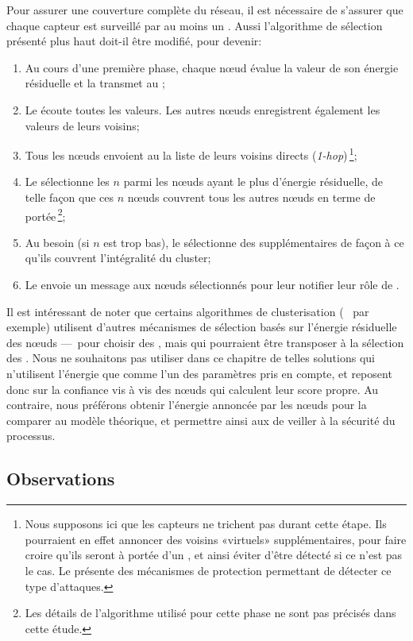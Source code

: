Pour assurer une couverture complète du réseau, il est nécessaire de s'assurer que chaque capteur est surveillé par au moins un \cn.
Aussi l'algorithme de sélection présenté plus haut doit-il être modifié, pour devenir:
\begin{enumerate}
    \item Au cours d'une première phase, chaque nœud évalue la valeur de son énergie résiduelle et la transmet au \ch;
    \item Le \ch écoute toutes les valeurs. Les autres nœuds enregistrent également les valeurs de leurs voisins;
    \item Tous les nœuds envoient au \CH la liste de leurs voisins directs (\textit{1-hop})\,\footnote{Nous supposons ici que les capteurs ne trichent pas durant cette étape. Ils pourraient en effet annoncer des voisins «virtuels» supplémentaires, pour faire croire qu'ils seront à portée d'un \cn, et ainsi éviter d'être détecté si ce n'est pas le cas. Le  présente des mécanismes de protection permettant de détecter ce type d'attaques.};
    \item Le \CH sélectionne les $n$ \cns parmi les nœuds ayant le plus d'énergie résiduelle, de telle façon que ces $n$ nœuds couvrent tous les autres nœuds en terme de portée\,\footnote{Les détails de l'algorithme utilisé pour cette phase ne sont pas précisés dans cette étude.};
    \item Au besoin (si $n$ est trop bas), le \CH sélectionne des \cns supplémentaires de façon à ce qu'ils couvrent l'intégralité du cluster;
    \item Le \CH envoie un message aux nœuds sélectionnés pour leur notifier leur rôle de \cn.
\end{enumerate}

Il est intéressant de noter que certains algorithmes de clusterisation (\heed~\cite{YF04} par exemple) utilisent d'autres mécanismes de sélection basés sur l'énergie résiduelle des nœuds ---~pour choisir des \chs, mais qui pourraient être transposer à la sélection des \cns.
Nous ne souhaitons pas utiliser dans ce chapitre de telles solutions qui n'utilisent l'énergie que comme l'un des paramètres pris en compte, et reposent donc sur la confiance vis à vis des nœuds qui calculent leur score propre.
Au contraire, nous préférons obtenir l'énergie annoncée par les nœuds pour la comparer au modèle théorique, et permettre ainsi aux \vns de veiller à la sécurité du processus.

    \subsection{Observations}


